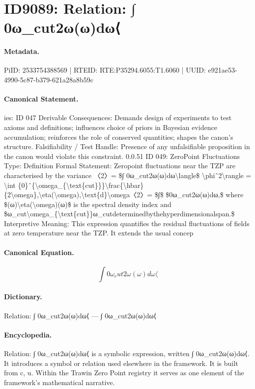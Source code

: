 \section*{ID9089: Relation: ∫ 0ω\_cut2ω(ω)dω⟨}
\paragraph{Metadata.}
PiID: 2533754388569 | RTEID: RTE:P35294.6055:T1.6060 | UUID: e921ae53-4990-5c87-b379-621a28a8b59c

\paragraph{Canonical Statement.}
ies: ID 047 Derivable Consequences: Demands design of experiments to test axioms and definitions; influences choice of priors in Bayesian evidence accumulation; reinforces the role of conserved quantities; shapes the canon’s structure. Falsifiability / Test Handle: Presence of any unfalsifiable proposition in the canon would violate this constraint. 0.0.51 ID 049: ZeroPoint Fluctuations Type: Definition Formal Statement: Zeropoint fluctuations near the TZP are characterised by the variance 〈2〉= \$∫ 0ω\_cut2ω(ω)dω\textbackslash{}langle\$ \textbackslash{}phiˆ2\textbackslash{}rangle = \textbackslash{}int \{0\}ˆ\{\textbackslash{}omega\_\{\textbackslash{}text\{cut\}\}\}\textbackslash{}frac\{\textbackslash{}hbar\}\{2\textbackslash{}omega\},\textbackslash{}eta(\textbackslash{}omega),\textbackslash{}text\{d\}\textbackslash{}omega〈2〉= \$∫\$ \$0ω\_cut2ω(ω)dω,\$ where \$(ω)\textbackslash{}eta(\textbackslash{}omega)(ω)\$ is the spectral density index and \$ω\_cut\textbackslash{}omega\_\{\textbackslash{}text\{cut\}\}ω\_cutdeterminedbythehyperdimensionalspan.\$ Interpretive Meaning: This expression quantifies the residual fluctuations of fields at zero temperature near the TZP. It extends the usual concep

\paragraph{Canonical Equation.}
\[
∫ 0ω_cut2ω(ω)dω\langle
\]

\paragraph{Dictionary.}
Relation: ∫ 0ω\_cut2ω(ω)dω⟨ — ∫ 0ω\_cut2ω(ω)dω⟨

\paragraph{Encyclopedia.}
Relation: ∫ 0ω\_cut2ω(ω)dω⟨ is a symbolic expression, written ∫ 0ω\_cut2ω(ω)dω⟨. It introduces a symbol or relation used elsewhere in the framework. It is built from c, u. Within the Trawin Zero Point registry it serves as one element of the framework's mathematical narrative.
